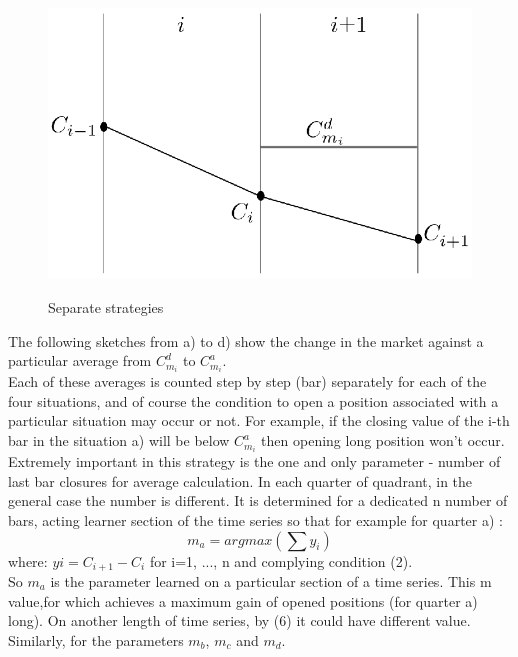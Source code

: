 \documentclass{tewiart}
\begin{document}
\begin{figure}[h]
\begin{minipage}{.49\linewidth}
\label{cztero}
\end{minipage}
\begin{minipage}{.49\linewidth}
\centering 
\includegraphics[width=\textwidth]{rysunek2d.eps}
\label{mansard}
\end{minipage}
\caption{Separate strategies}
\end{figure}
\FloatBarrier
\indent The following sketches from a) to d) show the change in the market against a particular average from $C^d_{m_{i}}$ to $C^a_{m_{i}}$.\\
\indent Each of these averages is counted step by step (bar) separately for each of the four situations, and of course the condition to open a position associated with a particular situation may occur or not. For example, if the closing value of the i-th bar in the situation a) will be below $C^a_{m_{i}}$ then opening long position won't occur.\\
\indent Extremely important in this strategy is the one and only parameter - number of last bar closures for average calculation. In each quarter of quadrant, in the general case the number is different. It is determined for a dedicated n number of bars, acting learner section of the time series so that for example for quarter a) :\\
\begin{equation}
	m_a = argmax (\sum y_i  )
\end{equation}
where: $yi = C_{i+1} - C_{i}$ for i=1, ..., n and complying  condition (2).\\
\indent So $m_{a}$ is the parameter learned on a particular section of a time series. This m value,for which achieves a maximum gain of opened positions (for quarter a) long). On another length of time series, by (6) it could have different value. Similarly, for the parameters $m_{b}$, $m_{c}$ and $m_{d}$.\\
\end{document}
